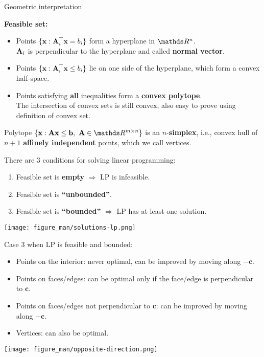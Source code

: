 \documentclass[11pt,compress,t,notes=noshow, xcolor=table]{beamer}
\begin{document}
\begin{vbframe}{Geometric interpretation}
    
\textbf{Feasible set:}
\begin{itemize}
    \setlength{\itemsep}{1em}
    \item Points $\{\mathbf{x}: \mathbf{A}_i^\top \mathbf{x} = b_i\}$ form a hyperplane in $\R^n$.\\
          $\mathbf{A}_i$ is perpendicular to the hyperplane and called \textbf{normal vector}.
    \item Points $\{\mathbf{x}: \mathbf{A}_i^\top \mathbf{x} \le b_i\}$ lie on one side of the hyperplane, which form a convex half-space.
    \item Points satisfying \textbf{all} inequalities form a \textbf{convex polytope}.\\
          The intersection of convex sets is still convex, also easy to prove using definition of convex set.
\end{itemize}

\lz

Polytope $\{\xv: \Amat \xv \le \mathbf{b},\ \Amat \in \R^{m \times n}\}$ is an $n$-\textbf{simplex}, i.e., 
convex hull of $n + 1$ \textbf{affinely independent} points, which we call vertices.

\framebreak

There are 3 conditions for solving linear programming:
\begin{enumerate}
\item Feasible set is \textbf{empty} $\Rightarrow$ LP is infeasible.
\item Feasible set is \textbf{\enquote{unbounded}}.
\item Feasible set is \textbf{\enquote{bounded}} $\Rightarrow$ LP has at least one solution.
\end{enumerate}

\begin{center}
    \texttt{[image: figure\_man/solutions-lp.png]}
\end{center}

\framebreak

Case 3 when LP is feasible and bounded:
\begin{itemize}
\item Points on the interior: never optimal, can be improved by moving along $−\mathbf{c}$.
\item Points on faces/edges: can be optimal only if the face/edge is perpendicular to $\mathbf{c}$. 
\item Points on faces/edges not perpendicular to $\mathbf{c}$: can be improved by moving along $-\mathbf{c}$.
\item Vertices: can also be optimal.
\end{itemize}

\begin{center}
    \texttt{[image: figure\_man/opposite-direction.png]}
\end{center}

\end{vbframe}
\end{document}
